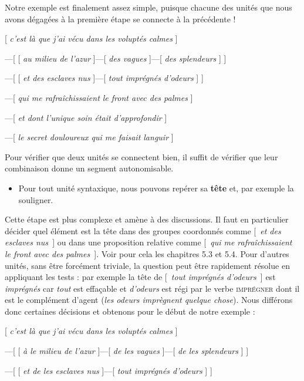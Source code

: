 Notre exemple est finalement assez simple, puisque chacune des unités que nous avons dégagées à la première étape se connecte à la précédente !

\ea{}
[ \textit{c’est là que j’ai vécu dans les voluptés calmes} ]

—[ [ \textit{au milieu de l’azur} ]—[ \textit{des vagues} ]—[ \textit{des splendeurs} ] ]

—[ [ \textit{et des esclaves nus} ]—[ \textit{tout imprégnés d’odeurs} ] ]

—[ \textit{qui me rafraîchissaient le front avec des palmes} ]

—[ \textit{et dont l’unique soin était d’approfondir} ]

—[ \textit{le secret douloureux qui me faisait languir} ]
\z

Pour vérifier que deux unités se connectent bien, il suffit de vérifier que leur combinaison donne un segment autonomisable.

\begin{itemize}
\item \begin{styleLivreImportant}
Pour tout unité syntaxique, nous pouvons repérer sa \textbf{tête} et, par exemple la souligner.
\end{styleLivreImportant}
\end{itemize}

Cette étape est plus complexe et amène à des discussions. Il faut en particulier décider quel élément est la tête dans des groupes coordonnés comme [~\textit{et des esclaves nus~}] ou dans une proposition relative comme [~\textit{qui me rafraîchissaient le front avec des palmes~}]. Voir pour cela les chapitres 5.3 et 5.4. Pour d’autres unités, sans être forcément triviale, la question peut être rapidement résolue en appliquant les tests : par exemple la tête de [~\textit{tout imprégnés d’odeurs~}] est \textit{imprégnés} car \textit{tout} est effaçable et \textit{d’odeurs} est régi par le verbe \textsc{imprégner} dont il est le complément d’agent (\textit{les odeurs imprègnent quelque chose}). Nous différons donc certaines décisions et obtenons pour le début de notre exemple :

\ea{}
[ \textit{c’est là que j’ai vécu dans les voluptés calmes} ]

—[ [ \textit{à le milieu de l’azur} ]—[ \textit{de les vagues} ]—[ \textit{de les splendeurs} ] ]

—[ [ \textit{et de les esclaves nus} ]—[ \textit{tout imprégnés d’odeurs} ] ]
\z

